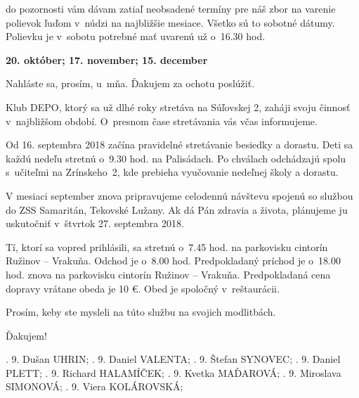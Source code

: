 do pozornosti vám dávam zatiaľ neobsadené termíny pre náš zbor na varenie polievok ľuďom v~núdzi na najbližšie mesiace.
Všetko sú to sobotné dátumy. Polievku je v~sobotu potrebné mať uvarenú už o~16.30 hod.

{\bf 20. október; 17. november; 15. december}

Nahláste sa, prosím, u~mňa.
Ďakujem za ochotu poslúžiť.



Klub DEPO, ktorý sa už dlhé roky stretáva na Súľovskej 2, zaháji svoju činnosť v~najbližšom období. O~presnom čase stretávania vás včas informujeme.


Od 16. septembra 2018 začína pravidelné stretávanie besiedky a dorastu. Deti sa každú nedeľu stretnú o~9.30 hod. na Palisádach. Po chválach odchádzajú spolu s~učiteľmi na Zrínskeho~2, kde prebieha vyučovanie nedeľnej školy a dorastu.


V mesiaci september znova pripravujeme celodennú návštevu spojenú so službou do ZSS Samaritán, Tekovské Lužany. Ak dá Pán zdravia a života, plánujeme ju uskutočniť v~štvrtok 27. septembra 2018.

Tí, ktorí sa vopred prihlásili, sa stretnú o~7.45 hod. na parkovisku cintorín Ružinov -- Vrakuňa. Odchod je o~8.00 hod. Predpokladaný príchod je o~18.00 hod. znova na parkovisku cintorín Ružinov -- Vrakuňa. Predpokladaná cena dopravy vrátane obeda je 10 €. Obed je spoločný v~reštaurácii.

Prosím, keby ste mysleli na túto službu na svojich modlitbách.

Ďakujem!


.	9.	Dušan	UHRIN;
.	9.	Daniel	VALENTA;
.	9.	Štefan	SYNOVEC;
.	9.	Daniel	PLETT;
.	9.	Richard	HALAMÍČEK;
.	9.	Kvetka	MAĎAROVÁ;
.	9.	Miroslava	SIMONOVÁ;
.	9.	Viera	KOLÁROVSKÁ;
\narodeniny


